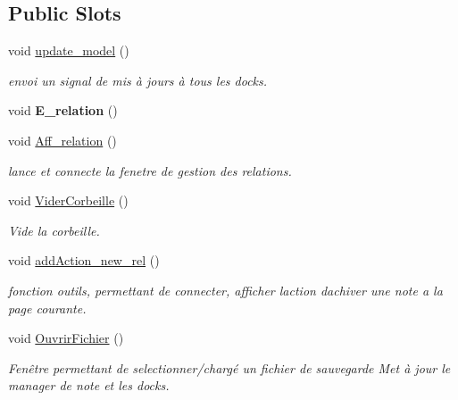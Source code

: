 \subsection*{Public Slots}
\begin{DoxyCompactItemize}
\item 
\mbox{\label{classinterface_ac23ab5d301d541fecb1c92e214935fd1}} 
void \hyperlink{classinterface_ac23ab5d301d541fecb1c92e214935fd1}{update\+\_\+model} ()
\begin{DoxyCompactList}\small\item\em envoi un signal de mis à jours à tous les docks. \end{DoxyCompactList}\item 
\mbox{\label{classinterface_a65202c3659f8058ab91b3b01cf8f267f}} 
void {\bfseries E\+\_\+relation} ()
\item 
void \hyperlink{classinterface_a287c8a46ece12a94540a190b96b911c9}{Aff\+\_\+relation} ()
\begin{DoxyCompactList}\small\item\em lance et connecte la fenetre de gestion des relations. \end{DoxyCompactList}\item 
void \hyperlink{classinterface_a430ee153cb2ea74b9103081d48cd61f3}{Vider\+Corbeille} ()
\begin{DoxyCompactList}\small\item\em Vide la corbeille. \end{DoxyCompactList}\item 
\mbox{\label{classinterface_afda8f97b198f7d434cb1eb2d845dfefc}} 
void \hyperlink{classinterface_afda8f97b198f7d434cb1eb2d845dfefc}{add\+Action\+\_\+new\+\_\+rel} ()
\begin{DoxyCompactList}\small\item\em fonction outils, permettant de connecter, afficher l\textquotesingle{}action d\textquotesingle{}achiver une note a la page courante. \end{DoxyCompactList}\item 
\mbox{\label{classinterface_af42d8f6426ad19ce13f1dd2ce9f519c1}} 
void \hyperlink{classinterface_af42d8f6426ad19ce13f1dd2ce9f519c1}{Ouvrir\+Fichier} ()
\begin{DoxyCompactList}\small\item\em Fenêtre permettant de selectionner/chargé un fichier de sauvegarde Met à jour le manager de note et les docks. \end{DoxyCompactList}\item 

\end{DoxyCompactItemize}
